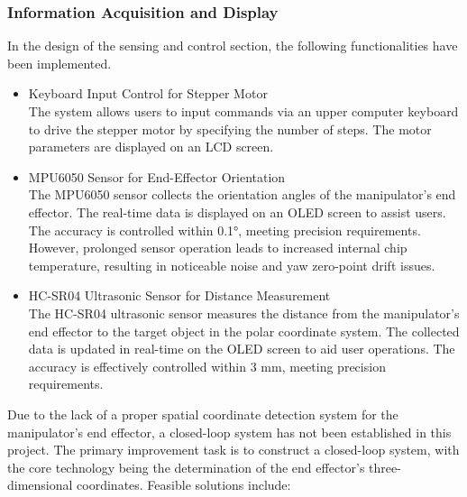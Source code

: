 \subsubsection{Information Acquisition and Display}
In the design of the sensing and control section, the following functionalities have been implemented. 
\begin{itemize}
    \item Keyboard Input Control for Stepper Motor \\
    The system allows users to input commands via an upper computer keyboard to drive the stepper motor by specifying 
    the number of steps. The motor parameters are displayed on an LCD screen.
    \item MPU6050 Sensor for End-Effector Orientation \\
    The MPU6050 sensor collects the orientation angles of the manipulator’s end effector. The real-time data is displayed 
    on an OLED screen to assist users. The accuracy is controlled within 0.1°, meeting precision requirements. However, 
    prolonged sensor operation leads to increased internal chip temperature, resulting in noticeable noise and yaw zero-point 
    drift issues.
    \item HC-SR04 Ultrasonic Sensor for Distance Measurement \\
    The HC-SR04 ultrasonic sensor measures the distance from the manipulator’s end effector to the target object in 
    the polar coordinate system. The collected data is updated in real-time on the OLED screen to aid user operations. 
    The accuracy is effectively controlled within 3 mm, meeting precision requirements.
\end{itemize}
Due to the lack of a proper spatial coordinate detection system for the manipulator’s end effector, a closed-loop system has not 
been established in this project. The primary improvement task is to construct a closed-loop system, with the core technology 
being the determination of the end effector’s three-dimensional coordinates. Feasible solutions include:
